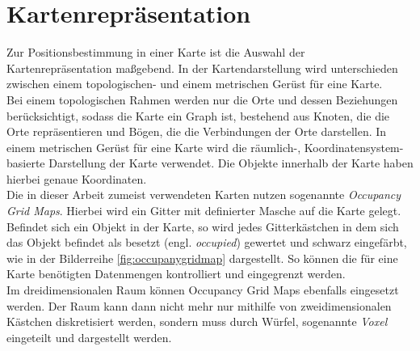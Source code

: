 \section{Kartenrepräsentation}\label{sec:Kartenrepräsentation}
Zur Positionsbestimmung in einer Karte ist die Auswahl der Kartenrepräsentation maßgebend. In der Kartendarstellung wird unterschieden zwischen einem topologischen- und einem metrischen Gerüst für eine Karte.\\
Bei einem topologischen Rahmen werden nur die Orte und dessen Beziehungen berücksichtigt, sodass die Karte ein Graph ist, bestehend aus Knoten, die die Orte repräsentieren und Bögen, die die Verbindungen der Orte darstellen. In einem metrischen Gerüst für eine Karte wird die räumlich-, Koordinatensystem-basierte Darstellung der Karte verwendet. Die Objekte innerhalb der Karte haben hierbei genaue Koordinaten.\\
Die in dieser Arbeit zumeist verwendeten Karten nutzen sogenannte \textit{Occupancy Grid Maps}. Hierbei wird ein Gitter mit definierter Masche auf die Karte gelegt. Befindet sich ein Objekt in der Karte, so wird jedes Gitterkästchen in dem sich das Objekt befindet als besetzt (engl. \textit{occupied}) gewertet und schwarz eingefärbt, wie in der Bilderreihe \ref{fig:occupanygridmap} dargestellt. So können die für eine Karte benötigten Datenmengen kontrolliert und eingegrenzt werden.\\
Im dreidimensionalen Raum können Occupancy Grid Maps ebenfalls eingesetzt werden. Der Raum kann dann nicht mehr nur mithilfe von zweidimensionalen Kästchen diskretisiert werden, sondern muss durch Würfel, sogenannte \textit{Voxel} eingeteilt und dargestellt werden.\\

